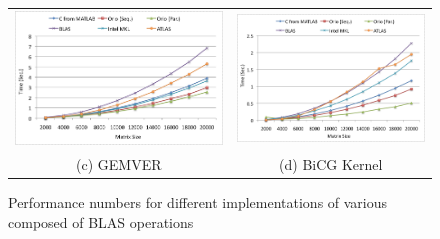 \documentclass[runningheads]{llncs}
\begin{document}
\begin{figure}[htp]
{\begin{tabular}{cc}
\begin{minipage}[b]{.515\textwidth}
\includegraphics[width=\textwidth]{figures/gemver.png}
\end{minipage}
&
\begin{minipage}[b]{.515\textwidth}
\includegraphics[width=\textwidth]{figures/bicgkernel.png}
\end{minipage}\\

(c) GEMVER & (d) BiCG Kernel \\

\end{tabular}
}
\caption{Performance numbers for different implementations of various composed of BLAS operations}
\label{fig:results}
\end{figure}
\end{document}
